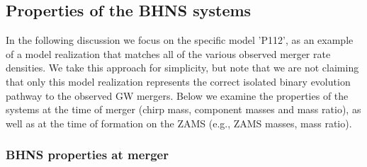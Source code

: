 \documentclass{aastex63}
\begin{document}

\subsection{Properties of the BHNS systems}
\label{sec:results-matching-the-GW-properties}
%
In the following discussion we focus on the specific model 'P112', as an example of a model realization that matches all of the various observed merger rate densities.  We take this approach for simplicity, but note that we are not claiming that only this model realization represents the correct isolated binary evolution pathway to the observed \ac{GW} mergers. 
Below we examine the properties of the systems at the time of merger (chirp mass, component masses and mass ratio), as well as at the time of formation on the \ac{ZAMS} (e.g., ZAMS masses, mass ratio).

\subsubsection{BHNS properties at merger}
\label{results:BHNS-properties-at-merger}
\end{document}
